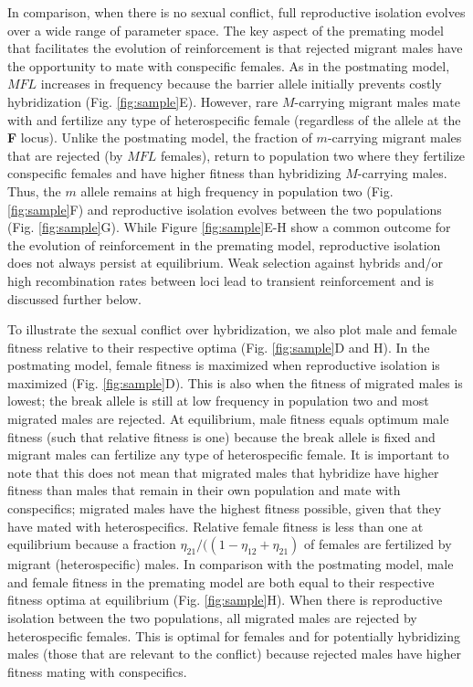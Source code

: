 \documentclass[11pt]{article}
\begin{document}
In comparison, when there is no sexual conflict, full reproductive isolation evolves over a wide range of parameter space.  The key aspect of the premating model that facilitates the evolution of reinforcement is that rejected migrant males have the opportunity to mate with conspecific females.  As in the postmating model, $MFL$ increases in frequency because the barrier allele initially prevents costly hybridization (Fig. \ref{fig:sample}E). However, rare $M$-carrying migrant males mate with and fertilize any type of heterospecific female (regardless of the allele at the \textbf{F} locus). Unlike the postmating model, the fraction of $m$-carrying migrant males that are rejected (by $MFL$ females), return to population two where they fertilize conspecific females and have higher fitness than hybridizing $M$-carrying males.  Thus, the $m$ allele remains at high frequency in population two (Fig. \ref{fig:sample}F) and reproductive isolation evolves between the two populations (Fig. \ref{fig:sample}G).  While Figure \ref{fig:sample}E-H show a common outcome for the evolution of reinforcement in the premating model, reproductive isolation does not always persist at equilibrium. Weak selection against hybrids and/or high recombination rates between loci lead to transient reinforcement and is discussed further below. 

To illustrate the sexual conflict over hybridization, we also plot male and female fitness relative to their respective optima (Fig. \ref{fig:sample}D and H). In the postmating model, female fitness is maximized when reproductive isolation is maximized (Fig. \ref{fig:sample}D). This is also when the fitness of migrated males is lowest; the break allele is still at low frequency in population two and most migrated males are rejected.  At equilibrium, male fitness equals optimum male fitness (such that relative fitness is one) because the break allele is fixed and migrant males can fertilize any type of heterospecific female. It is important to note that this does not mean that migrated males that hybridize have higher fitness than males that remain in their own population and mate with conspecifics; migrated males have the highest fitness possible, given that they have mated with heterospecifics.  Relative female fitness is less than one at equilibrium because a fraction $\eta_{21}/((1-\eta_{12} + \eta_{21})$ of females are fertilized by migrant (heterospecific) males. In comparison with the postmating model, male and female fitness in the premating model are both equal to their respective fitness optima at equilibrium (Fig. \ref{fig:sample}H).  When there is reproductive isolation between the two populations, all migrated males are rejected by heterospecific females.  This is optimal for females and for potentially hybridizing males (those that are relevant to the conflict) because rejected males have higher fitness mating with conspecifics.
\end{document}

